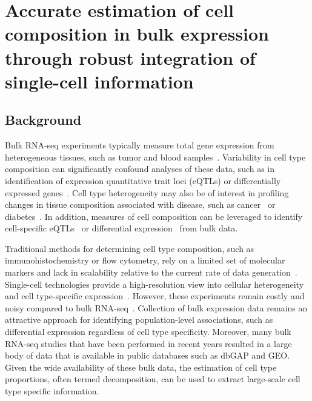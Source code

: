\setlength{\arrayrulewidth}{1.1pt}
\bgroup
\def\arraystretch{1.5}

\chapter{Accurate estimation of cell composition in bulk expression through robust integration of single-cell information}

\section{Background}

Bulk RNA-seq experiments typically measure total gene expression from heterogeneous tissues, such as tumor and blood samples~\cite{Tomczak2015-kt,GTEx_Consortium2015-vl}. Variability in cell type composition can significantly confound analyses of these data, such as in identification of expression quantitative trait loci (eQTLs) or differentially expressed genes~\cite{Bruning2016-vb}. Cell type heterogeneity may also be of interest in profiling changes in tissue composition associated with disease, such as cancer~\cite{Fridman2012-bi} or diabetes~\cite{Rahier1983-gh}. In addition, measures of cell composition can be leveraged to identify cell-specific eQTLs~\cite{Westra2015-vq, Shen-Orr2010-tg} or differential expression~\cite{Shen-Orr2010-tg} from bulk data. 

Traditional methods for determining cell type composition, such as immunohistochemistry or flow cytometry, rely on a limited set of molecular markers and lack in scalability relative to the current rate of data generation~\cite{Hu2016-he}. Single-cell technologies provide a high-resolution view into cellular heterogeneity and cell type-specific expression~\cite{Zheng2017-pq,Tasic2018-ue,Macosko2015-yn}. However, these experiments remain costly and noisy compared to bulk RNA-seq~\cite{Wang2018-oj}. Collection of bulk expression data remains an attractive approach for identifying population-level associations, such as differential expression regardless of cell type specificity. Moreover, many bulk RNA-seq studies that have been performed in recent years resulted in a large body of data that is available in public databases such as dbGAP and GEO. Given the wide availability of these bulk data, the estimation of cell type proportions, often termed decomposition, can be used to extract large-scale cell type specific information.

